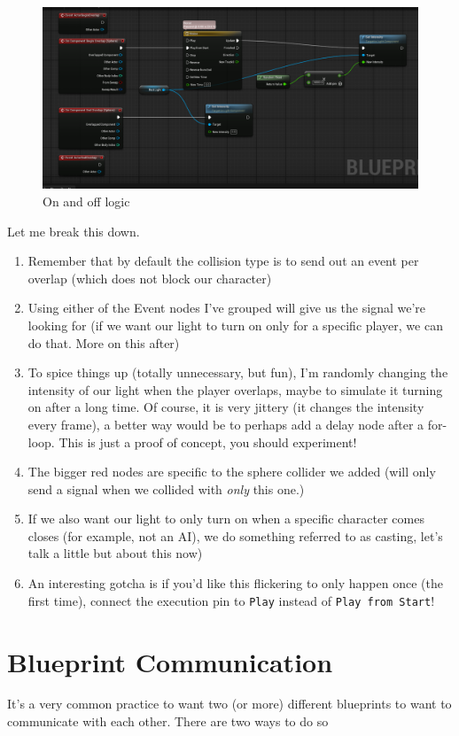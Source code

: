 \documentclass[]{article}
\begin{document}
	
	\begin{figure}[h]
		\centering
		\includegraphics[width=1\linewidth]{week2part2/screenshot016}
		\caption{On and off logic}
		\label{fig:screenshot016}
	\end{figure}
	\newpage
	Let me break this down.
	\begin{enumerate}
		\item Remember that by default the collision type is to send out an event per overlap (which does not block our character)
		\item Using either of the Event nodes I've grouped will give us the signal we're looking for (if we want our light to turn on only for a specific player, we can do that. More on this after)
		\item To spice things up (totally unnecessary, but fun), I'm randomly changing the intensity of our light when the player overlaps, maybe to simulate it turning on after a long time. Of course, it is very jittery (it changes the intensity every frame), a better way would be to perhaps add a delay node after a for-loop. This is just a proof of concept, you should experiment!
		\item The bigger red nodes are specific to the sphere collider we added (will only send a signal when we collided with \emph{only} this one.)
		\item If we also want our light to only turn on when a specific character comes closes (for example, not an AI), we do something referred to as casting, let's talk a little but about this now)
		\item An interesting gotcha is if you'd like this flickering to only happen once (the first time), connect the execution pin to \verb*|Play| instead of \verb|Play from Start|!
	\end{enumerate}
	
	\section{Blueprint Communication}
	It's a very common practice to want two (or more) different blueprints to want to communicate with each other. There are two ways to do so
	
\end{document}
